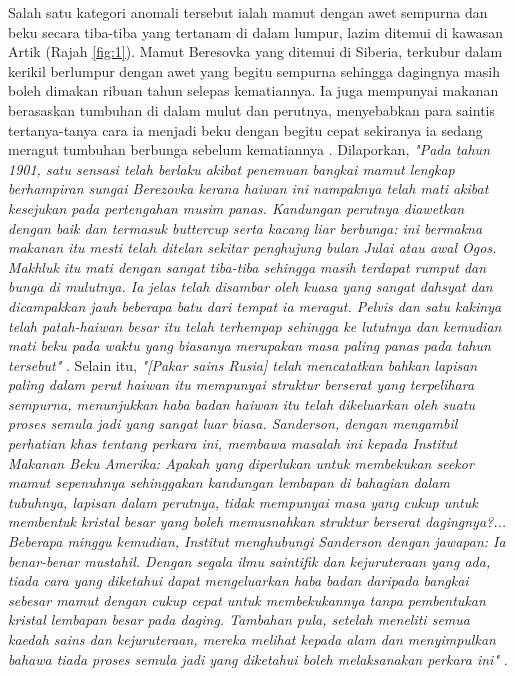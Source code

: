 \documentclass[10pt,twocolumn,letterpaper]{article}
\begin{document}
Salah satu kategori anomali tersebut ialah mamut dengan awet sempurna dan beku secara tiba-tiba yang tertanam di dalam lumpur, lazim ditemui di kawasan Artik (Rajah \ref{fig:1}). Mamut Beresovka yang ditemui di Siberia, terkubur dalam kerikil berlumpur dengan awet yang begitu sempurna sehingga dagingnya masih boleh dimakan ribuan tahun selepas kematiannya. Ia juga mempunyai makanan berasaskan tumbuhan di dalam mulut dan perutnya, menyebabkan para saintis tertanya-tanya cara ia menjadi beku dengan begitu cepat sekiranya ia sedang meragut tumbuhan berbunga sebelum kematiannya \cite{17}. Dilaporkan, \textit{"Pada tahun 1901, satu sensasi telah berlaku akibat penemuan bangkai mamut lengkap berhampiran sungai Berezovka kerana haiwan ini nampaknya telah mati akibat kesejukan pada pertengahan musim panas. Kandungan perutnya diawetkan dengan baik dan termasuk buttercup serta kacang liar berbunga: ini bermakna makanan itu mesti telah ditelan sekitar penghujung bulan Julai atau awal Ogos. Makhluk itu mati dengan sangat tiba-tiba sehingga masih terdapat rumput dan bunga di mulutnya. Ia jelas telah disambar oleh kuasa yang sangat dahsyat dan dicampakkan jauh beberapa batu dari tempat ia meragut. Pelvis dan satu kakinya telah patah-haiwan besar itu telah terhempap sehingga ke lututnya dan kemudian mati beku pada waktu yang biasanya merupakan masa paling panas pada tahun tersebut"} \cite{18}. Selain itu, \textit{"[Pakar sains Rusia] telah mencatatkan bahkan lapisan paling dalam perut haiwan itu mempunyai struktur berserat yang terpelihara sempurna, menunjukkan haba badan haiwan itu telah dikeluarkan oleh suatu proses semula jadi yang sangat luar biasa. Sanderson, dengan mengambil perhatian khas tentang perkara ini, membawa masalah ini kepada Institut Makanan Beku Amerika: Apakah yang diperlukan untuk membekukan seekor mamut sepenuhnya sehinggakan kandungan lembapan di bahagian dalam tubuhnya, lapisan dalam perutnya, tidak mempunyai masa yang cukup untuk membentuk kristal besar yang boleh memusnahkan struktur berserat dagingnya?... Beberapa minggu kemudian, Institut menghubungi Sanderson dengan jawapan: Ia benar-benar mustahil. Dengan segala ilmu saintifik dan kejuruteraan yang ada, tiada cara yang diketahui dapat mengeluarkan haba badan daripada bangkai sebesar mamut dengan cukup cepat untuk membekukannya tanpa pembentukan kristal lembapan besar pada daging. Tambahan pula, setelah meneliti semua kaedah sains dan kejuruteraan, mereka melihat kepada alam dan menyimpulkan bahawa tiada proses semula jadi yang diketahui boleh melaksanakan perkara ini"} \cite{19}.
\end{document}
